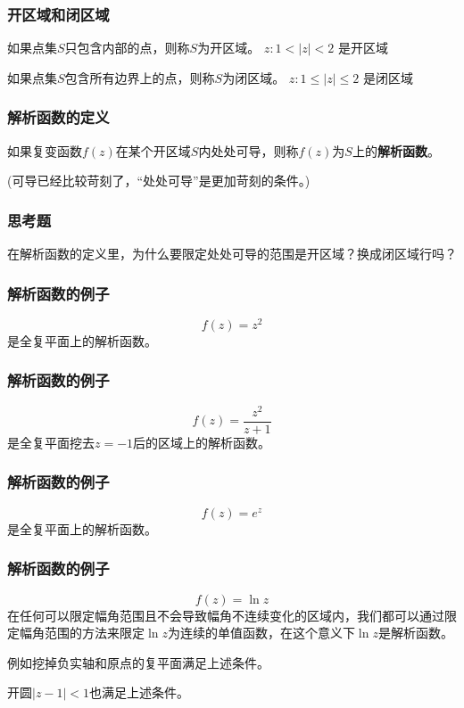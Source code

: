 \documentclass[CJK]{beamer}
\begin{document}
\begin{frame}
  \frametitle{开区域和闭区域}
  
  \bitem
  \item
 { 如果点集$S$只包含内部的点，则称$S$为开区域。
  \bex
  ${z: 1<|z|<2}$
  是开区域
  \eex
 }
 \item{
  如果点集$S$包含所有边界上的点，则称$S$为闭区域。
  \bex
  ${z: 1\le |z|\le 2}$
  是闭区域
  \eex
 }
   \eitem
  
\end{frame}

\begin{frame}
  \frametitle{解析函数的定义}
  
  如果复变函数$f(z)$在某个开区域$S$内处处可导，则称$f(z)$为$S$上的{\bf 解析函数}。

  \skiplines
  
  (可导已经比较苛刻了，“处处可导”是更加苛刻的条件。)
  
\end{frame}


\begin{frame}
  \frametitle{思考题}
  
  
  在解析函数的定义里，为什么要限定处处可导的范围是开区域？换成闭区域行吗？
  
\end{frame}


\begin{frame}
  \frametitle{解析函数的例子}
  
  \bex
  $$f(z) = z^2$$
  是全复平面上的解析函数。
  \eex
  
\end{frame}

\begin{frame}
  \frametitle{解析函数的例子}
  
  \bex
  $$f(z) = \frac{z^2}{z+1}$$
  是全复平面挖去$z=-1$后的区域上的解析函数。
  \eex
  
\end{frame}

\begin{frame}
  \frametitle{解析函数的例子}
  
  \bex
  $$f(z) = e^z$$
  是全复平面上的解析函数。
  \eex
  
\end{frame}


\begin{frame}
  \frametitle{解析函数的例子}
  
  \bex
  $$f(z) = \ln z$$
  在任何可以限定幅角范围且不会导致幅角不连续变化的区域内，我们都可以通过限定幅角范围的方法来限定$\ln z$为连续的单值函数，在这个意义下$\ln z$是解析函数。

  \skiplines
  
  例如挖掉负实轴和原点的复平面满足上述条件。

  开圆$|z-1|<1$也满足上述条件。

  \eex
  
\end{frame}
\end{document}
